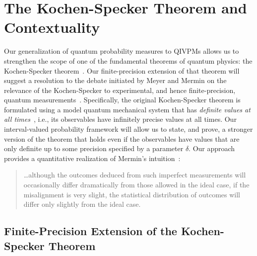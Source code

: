 \documentclass[english,reprint, aps, prl,superscriptaddress, showpacs,
showkeys, longbibliography, amsmath, amssymb, floatfix]{revtex4-1}
\theoremstyle{plain}
\theoremstyle{definition}
\begin{document}
\section{The Kochen-Specker Theorem and Contextuality}
\label{sec:Kochen-Specker}
  
Our generalization of quantum probability measures to QIVPMs allows us
to strengthen the scope of one of the fundamental theorems of quantum
physics: the Kochen-Specker
theorem~\cite{BELL_1966,kochenspecker1967,Redhead1987-REDINA,Mermin1990Simple,peres1995quantum,Jaeger2007,Held2016}. Our
finite-precision extension of that theorem will suggest a resolution
to the debate initiated by Meyer and Mermin on the relevance of the
Kochen-Specker to experimental, and hence finite-precision, quantum
measurements~\cite{PhysRevLett.83.3751,Mermin1999,Kent1999,HavlicekKrennSummhammerSvozil2001,SimonBruknerZeilinger2001,Cabello2002,Larsson2002,Appleby2002,BarrettKent2004,Appleby_2005,Spekkens2005,GuehneKleinmannCabelloEtAl2010,MazurekPuseyKunjwalEtAl2016}.
Specifically, the original Kochen-Specker theorem is formulated using
a model quantum mechanical system that has \emph{definite values at
  all times}~\cite{Held2016}, i.e., its observables have infinitely
precise values at all times. Our interval-valued probability framework
will allow us to state, and prove, a stronger version of the theorem
that holds even if the observables have values that are only definite
up to some precision specified by a parameter $\delta$. Our approach
provides a quantitative realization of Mermin's
intuition~\cite{Mermin1999}:
\begin{quote}
  \ldots although the outcomes deduced from such imperfect
  measurements will occasionally differ dramatically from those
  allowed in the ideal case, if the misalignment is very slight, the
  statistical distribution of outcomes will differ only slightly from
  the ideal case.
\end{quote}


\subsection{Finite-Precision Extension of the Kochen-Specker Theorem}
\end{document}
